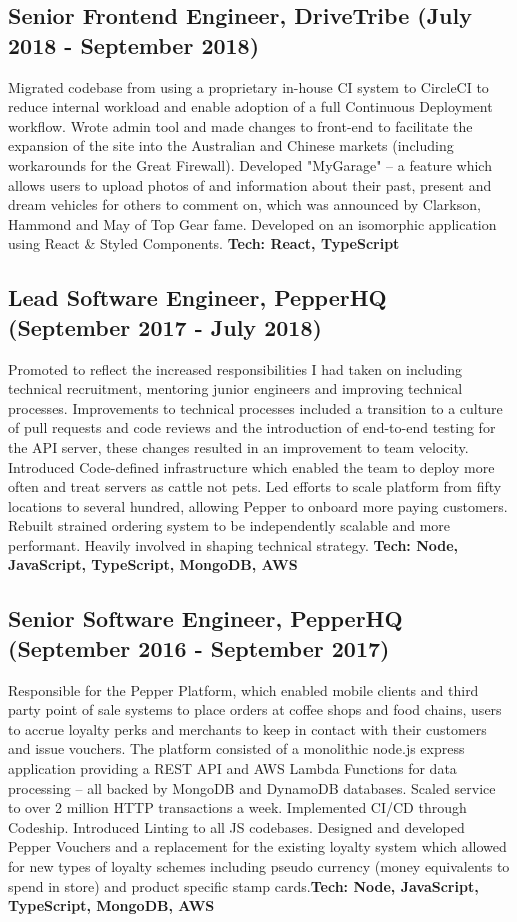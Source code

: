 \documentclass[10pt,letterpaper]{article}
\begin{document}
	\subsection*{Senior Frontend Engineer, DriveTribe \small{(July 2018 - September 2018)}}
	Migrated codebase from using a proprietary in-house CI system to CircleCI to reduce internal workload and enable adoption of a full Continuous Deployment workflow. Wrote admin tool and made changes to front-end to facilitate the expansion of the site into the Australian and Chinese markets (including workarounds for the Great Firewall). Developed "MyGarage" -- a feature which allows users to upload photos of and information about their past, present and dream vehicles for others to comment on, which was announced by Clarkson, Hammond and May of Top Gear fame. Developed on an isomorphic application using React \& Styled Components. \textbf{Tech: React, TypeScript}
	
	\subsection*{Lead Software Engineer, PepperHQ \small{(September 2017 - July 2018)}}
	Promoted to reflect the increased responsibilities I had taken on including technical recruitment, mentoring junior engineers and improving technical processes. Improvements to technical processes included a transition to a culture of pull requests and code reviews and the introduction of end-to-end testing for the API server, these changes resulted in an improvement to team velocity. Introduced Code-defined infrastructure which enabled the team to deploy more often and treat servers as cattle not pets. Led efforts to scale platform from fifty locations to several hundred, allowing Pepper to onboard more paying customers. Rebuilt strained ordering system to be independently scalable and more performant. Heavily involved in shaping technical strategy. \textbf{Tech: Node, JavaScript, TypeScript, MongoDB, AWS}
	
	\subsection*{Senior Software Engineer, PepperHQ \small{(September 2016 - September 2017)}}
	Responsible for the Pepper Platform, which enabled mobile clients and third party point of sale systems to place orders at coffee shops and food chains, users to accrue loyalty perks and merchants to keep in contact with their customers and issue vouchers. The platform consisted of a monolithic node.js express application providing a REST API and AWS Lambda Functions for data processing -- all backed by MongoDB and DynamoDB databases. Scaled service to over 2 million HTTP transactions a week. Implemented CI/CD through Codeship. Introduced Linting to all JS codebases. Designed and developed Pepper Vouchers and a replacement for the existing loyalty system which allowed for new types of loyalty schemes including pseudo currency (money equivalents to spend in store) and product specific stamp cards.\textbf{Tech: Node, JavaScript, TypeScript, MongoDB, AWS}
	
\end{document}

